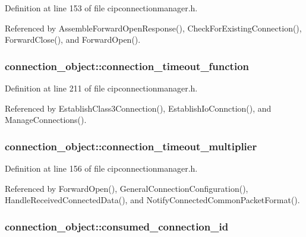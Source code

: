 \-Definition at line 153 of file cipconnectionmanager.\-h.



\-Referenced by \-Assemble\-Forward\-Open\-Response(), \-Check\-For\-Existing\-Connection(), \-Forward\-Close(), and \-Forward\-Open().

\hypertarget{structconnection__object_a1188e39b93ec13c5dca2c1c56d6ab07e}{
\subsubsection[{connection\-\_\-timeout\-\_\-function}]{ {\bf connection\-\_\-object\-::connection\-\_\-timeout\-\_\-function}}}\label{d1/d48/structconnection__object_a1188e39b93ec13c5dca2c1c56d6ab07e}


\-Definition at line 211 of file cipconnectionmanager.\-h.



\-Referenced by \-Establish\-Class3\-Connection(), \-Establish\-Io\-Connction(), and \-Manage\-Connections().

\hypertarget{structconnection__object_abc7006673b2cb7a9139d1bf209293773}{
\subsubsection[{connection\-\_\-timeout\-\_\-multiplier}]{ {\bf connection\-\_\-object\-::connection\-\_\-timeout\-\_\-multiplier}}}\label{d1/d48/structconnection__object_abc7006673b2cb7a9139d1bf209293773}


\-Definition at line 156 of file cipconnectionmanager.\-h.



\-Referenced by \-Forward\-Open(), \-General\-Connection\-Configuration(), \-Handle\-Received\-Connected\-Data(), and \-Notify\-Connected\-Common\-Packet\-Format().

\hypertarget{structconnection__object_a762ab498e7e93c55f9f5a442b014094f}{
\subsubsection[{consumed\-\_\-connection\-\_\-id}]{ {\bf connection\-\_\-object\-::consumed\-\_\-connection\-\_\-id}}}\label{d1/d48/structconnection__object_a762ab498e7e93c55f9f5a442b014094f}


